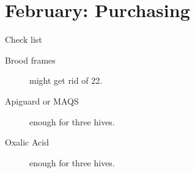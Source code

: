 \section{February: Purchasing}

Check list

\begin{description}

  \item[Brood frames] might get rid of 22.
  \item[Apiguard or MAQS] enough for three hives.
  \item[Oxalic Acid] enough for three hives.

\end{description}